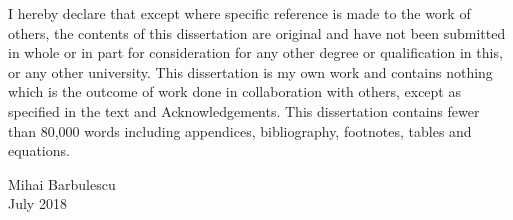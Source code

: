 \begin{declaration}

I hereby declare that except where specific reference is made to the work of others, the contents of this dissertation are original and have not been submitted in whole or in part for consideration for any other degree or qualification in this, or any other university.
This dissertation is my own work and contains nothing which is the outcome of work done in collaboration with others, except as specified in the text and Acknowledgements.
This dissertation contains fewer than 80,000 words including appendices, bibliography, footnotes, tables and equations.

\begin{flushright}
Mihai Barbulescu
\\
July 2018
\end{flushright}

\end{declaration}